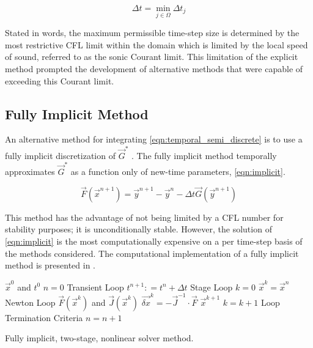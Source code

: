 \begin{equation}
\label{eqn:global_cfl}
\Delta t = \min_{j \in \Omega} \Delta t_j
\end{equation}

Stated in words, the maximum permissible time-step size is determined by the most restrictive CFL limit within the domain which is limited by the local speed of sound, referred to as the sonic Courant limit.
This limitation of the explicit method prompted the development of alternative methods that were capable of exceeding this Courant limit.

\subsection{Fully Implicit Method}
\label{subsect:numerics_fully_implicit}
An alternative method for integrating \eqref{eqn:temporal_semi_discrete} is to use a fully implicit discretization of $\vec{G}^{*}$ \cite{Frepoli2003, Barre1990}.
The fully implicit method temporally approximates $\vec{G}^{*}$ as a function only of new-time parameters, \eqref{eqn:implicit}.

\begin{equation}
\label{eqn:implicit}
\vec{F}(\vec{x}^{n+1}) = \vec{y}^{n+1} - \vec{y}^{n} - \Delta t \vec{G}(\vec{y}^{n+1})
\end{equation}

This method has the advantage of not being limited by a CFL number for stability purposes; it is unconditionally stable.
However, the solution of \eqref{eqn:implicit} is the most computationally expensive on a per time-step basis of the methods considered.
The computational implementation of a fully implicit method is presented in .

\begin{algo}[H]
\setlength{\baselineskip}{0.625\baselineskip}
\begin{algorithmic}[1]
\Require $\vec{x}^{0}$ and $t^{0}$
\Set $n = 0$
\Loop \; Transient Loop
    \State $t^{n+1} : = t^{n} + \Delta t$
     \; Stage Loop
    \State $k = 0$
    \State $\vec{x}^{k} = \vec{x}^{n}$
    \Loop \; Newton Loop
		\Calculate $\vec{F}(\vec{x}^{k})$ and $\vec{J}(\vec{x}^{k})$
		\Calculate $\vec{\delta x}^k = - \vec{J}^{-1}\cdot\vec{F}$
		\BlackBox $\vec{x}^{k+1}$
		\State $k = k + 1$
		\BlackBox Loop Termination Criteria
	\EndLoop	
	\EndFor
	\State $n = n + 1$
\EndLoop
\end{algorithmic}
\caption{Fully implicit, two-stage, nonlinear solver method.}
\label{algo:implicit}
\end{algo}

